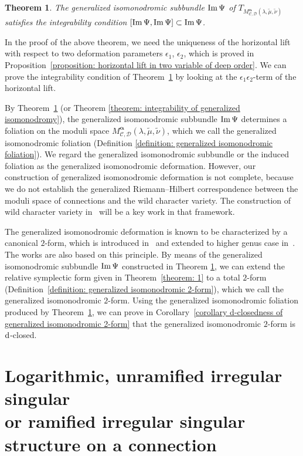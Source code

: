 \documentclass[pdftex]{sigma}
\numberwithin{equation}{section}
\newtheorem{Theorem}{Theorem}[section]
\newcommand\im{\mathop{\rm Im}\nolimits}
\newcommand{\balpha}{\boldsymbol \alpha}
\begin{document}
\begin{Theorem} \label{theorem: 3} The generalized isomonodromic subbundle $\im\Psi$ of
$T_{M^{\balpha}_{{\mathcal C},{\mathcal D}}(\lambda,\tilde{\mu},\tilde{\nu})}$
satisfies the integrability condition
$[\im\Psi,\im\Psi]\subset\im\Psi$.
\end{Theorem}

In the proof of the above theorem, we need the uniqueness of the horizontal lift
with respect to two deformation parameters $\epsilon_1$, $\epsilon_2$,
which is proved in Proposition~\ref{proposition: horizontal lift in two variable of deep order}.
We can prove the integrability condition of Theorem~\ref{theorem: 3}
by looking at the $\epsilon_1\epsilon_2$-term of the horizontal lift.

By Theorem~\ref{theorem: 3}
(or Theorem \ref{theorem: integrability of generalized isomonodromy}),
the generalized isomonodromic subbundle $\im\Psi$ determines a foliation on the moduli space
$M^{\balpha}_{{\mathcal C},{\mathcal D}}(\lambda,\tilde{\mu},\tilde{\nu})$,
which we call the generalized isomonodromic foliation
(Definition \ref{definition: generalized isomonodromic foliation}).
We regard the generalized isomonodromic subbundle or the induced foliation
as the generalized isomonodromic deformation.
However, our construction of generalized isomonodromic deformation is not complete,
because we do not establish the generalized Riemann--Hilbert correspondence
between the moduli space of connections and the wild character variety.
The construction of wild character variety in~\cite{Boalch-Yamakawa} will be
a key work in that framework.

The generalized isomonodromic deformation is known to be characterized by a canonical $2$-form,
which is introduced in~\cite{Jimbo-Miwa-Ueno} and extended to higher genus case
in~\cite{Krichever}.
The works \cite{Boalch-1,Bremer-Sage-2}
are also based on this principle.
By means of the generalized isomonodromic subbundle
$\im\Psi$ constructed in Theorem \ref{theorem: 3},
we can extend the relative symplectic form
given in Theorem~\ref{theorem: 1} to a total $2$-form
(Definition~\ref{definition: generalized isomonodromic 2-form}),
which we call the generalized isomonodromic $2$-form.
Using the generalized isomonodromic foliation produced by Theorem~\ref{theorem: 3},
we can prove in Corollary~\ref{corollary d-closedness of generalized isomonodromic 2-form}
that the generalized isomonodromic $2$-form is ${\rm d}$-closed.

\section[Logarithmic, unramified irregular singular or ramified irregular singular structure\\ on a connection]{Logarithmic, unramified irregular singular\\ or ramified irregular singular structure on a connection}\label{section: definition regular singular, unramified or ramified structure}
\end{document}
